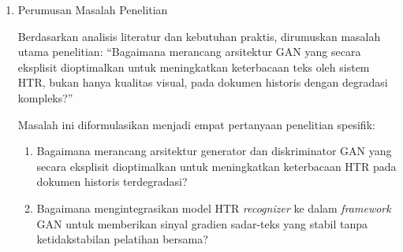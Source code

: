 \documentclass[12pt,a4paper]{article}
\begin{document}
\begin{enumerate}[label=\arabic*., leftmargin=*, nosep]
          \begin{enumerate}[label=(\alph*), leftmargin=*, nosep]
              \item Kesenjangan Metodologis---Ketidakstabilan Pelatihan Bersama: Metode yang ada menggunakan \textit{joint training} antara generator dan \textit{recognizer}, yang berpotensi menyebabkan ketidakstabilan optimisasi. Belum ada eksplorasi sistematis terhadap strategi \textit{frozen recognizer} sebagai evaluator objektif yang stabil.

              \item Kesenjangan Arsitektural---Evaluasi \textit{Single-Modal}: Diskriminator yang ada hanya mengevaluasi kualitas visual (\textit{single-modal} CNN), tanpa eksplorasi arsitektur \textit{dual-modal} yang dapat menangkap koherensi tekstual melalui jalur sekuensial (LSTM). Meskipun kontribusi empirisnya perlu divalidasi, eksplorasi ini penting untuk melengkapi pemahaman teoretis tentang evaluasi bilateral visual-tekstual dalam konteks GAN berorientasi HTR.

              \item Kesenjangan Evaluasi---Optimasi \textit{Loss Function}: Tidak ada studi ablasi sistematis yang mengidentifikasi konfigurasi optimal untuk menyeimbangkan komponen fungsi \textit{loss} (piksel, \textit{adversarial}, perseptual, CTC) guna mencapai keseimbangan Pareto antara kualitas visual dan keterbacaan HTR.
          \end{enumerate}

    \item Perumusan Masalah Penelitian

          Berdasarkan analisis literatur dan kebutuhan praktis, dirumuskan masalah utama penelitian: ``Bagaimana merancang arsitektur GAN yang secara eksplisit dioptimalkan untuk meningkatkan keterbacaan teks oleh sistem HTR, bukan hanya kualitas visual, pada dokumen historis dengan degradasi kompleks?''

          Masalah ini diformulasikan menjadi empat pertanyaan penelitian spesifik:

          \begin{enumerate}[label=RQ\arabic*:, leftmargin=*, nosep]
              \item Bagaimana merancang arsitektur generator dan diskriminator GAN yang secara eksplisit dioptimalkan untuk meningkatkan keterbacaan HTR pada dokumen historis terdegradasi?

              \item Bagaimana mengintegrasikan model HTR \textit{recognizer} ke dalam \textit{framework} GAN untuk memberikan sinyal gradien sadar-teks yang stabil tanpa ketidakstabilan pelatihan bersama?


\end{enumerate}
\end{enumerate}
\end{document}
